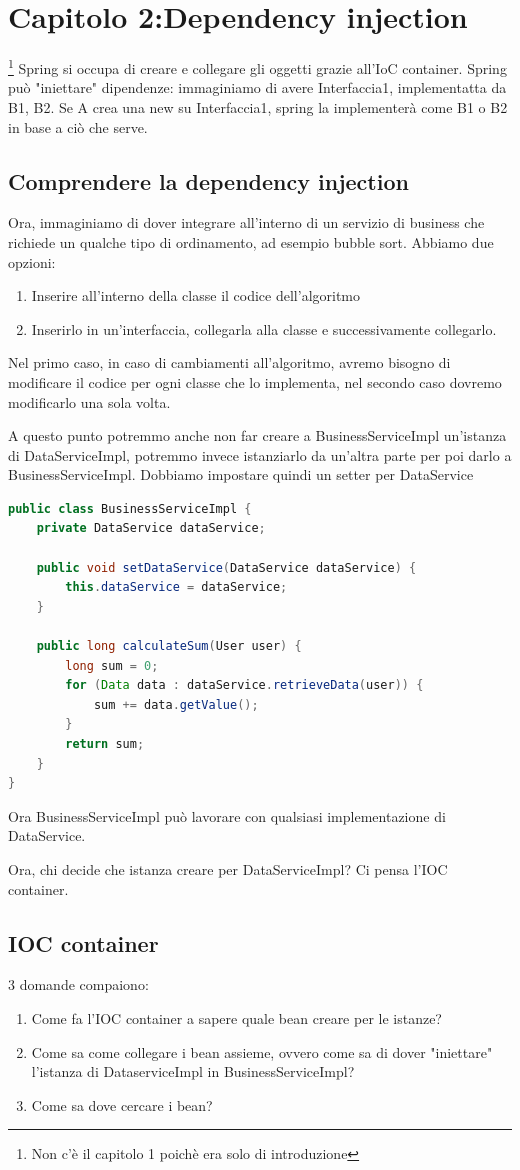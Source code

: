 \documentclass[11pt,a4paper]{book}
\begin{document}
\section{Capitolo 2:Dependency injection}\label{par: IOC}
\footnote{Non c'è il capitolo 1 poichè era solo di introduzione}
Spring si occupa di creare e collegare gli oggetti grazie all'IoC container. 
Spring può "iniettare" dipendenze: immaginiamo di avere Interfaccia1, implementatta da B1, B2. Se A crea una new su Interfaccia1, spring la implementerà come B1 o B2 in base a ciò che serve.
\subsection{Comprendere la dependency injection}
Ora, immaginiamo di dover integrare all'interno di un servizio di business che richiede un qualche tipo di ordinamento, ad esempio bubble sort. Abbiamo due opzioni:
\begin{enumerate}
	\item Inserire all'interno della classe il codice dell'algoritmo
	\item Inserirlo in un'interfaccia, collegarla alla classe e successivamente collegarlo.
\end{enumerate}
Nel primo caso, in caso di cambiamenti all'algoritmo, avremo bisogno di modificare il codice per ogni classe che lo implementa, nel secondo caso dovremo modificarlo una sola volta.

A questo punto potremmo anche non far creare a BusinessServiceImpl un'istanza di DataServiceImpl, potremmo invece istanziarlo da un'altra parte per poi darlo a BusinessServiceImpl. Dobbiamo impostare quindi un setter per DataService
\begin{lstlisting}[language = Java]
public class BusinessServiceImpl {
	private DataService dataService;
	
	public void setDataService(DataService dataService) {
		this.dataService = dataService;
	}
	
	public long calculateSum(User user) {
		long sum = 0;
		for (Data data : dataService.retrieveData(user)) {
			sum += data.getValue();
		}
		return sum;
	}
}
\end{lstlisting}
Ora BusinessServiceImpl può lavorare con qualsiasi implementazione di DataService.

Ora, chi decide che istanza creare per DataServiceImpl? Ci pensa l'IOC container.

\subsection{IOC container}
3 domande compaiono:
\begin{enumerate}
	\item Come fa l'IOC container a sapere quale bean creare per le istanze?
	\item Come sa come collegare i bean assieme, ovvero come sa di dover "iniettare" l'istanza di DataserviceImpl in BusinessServiceImpl?
	\item Come sa dove cercare i bean?
\end{enumerate}
\end{document}
